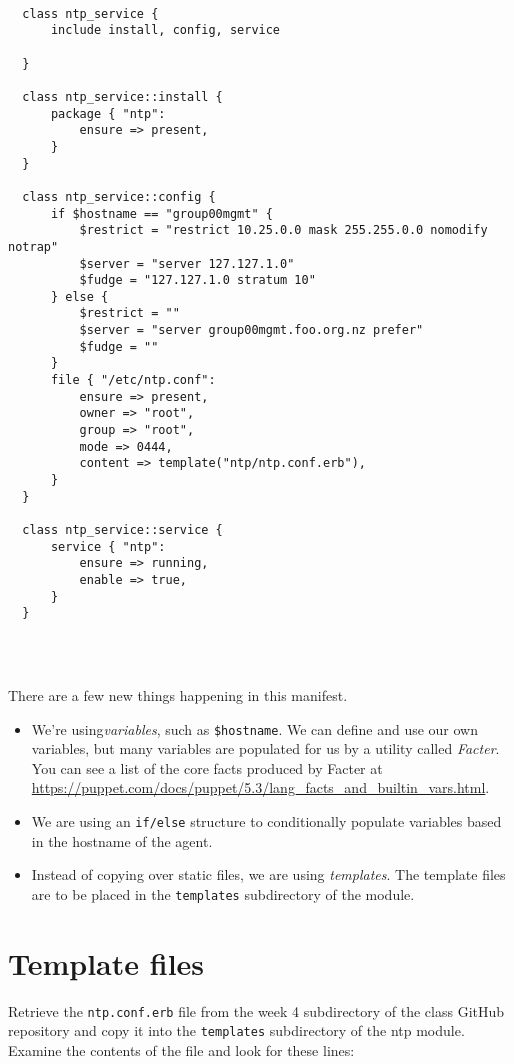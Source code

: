 \documentclass{article}   	%
\begin{document}
\begin{verbatim}

  class ntp_service {
      include install, config, service

  }

  class ntp_service::install {
      package { "ntp":
          ensure => present,
      }
  }

  class ntp_service::config {
      if $hostname == "group00mgmt" {
          $restrict = "restrict 10.25.0.0 mask 255.255.0.0 nomodify notrap"
          $server = "server 127.127.1.0"
          $fudge = "127.127.1.0 stratum 10"
      } else {
          $restrict = ""
          $server = "server group00mgmt.foo.org.nz prefer"
          $fudge = ""
      }
      file { "/etc/ntp.conf":
          ensure => present,
          owner => "root",
          group => "root",
          mode => 0444,
          content => template("ntp/ntp.conf.erb"),
      }    
  }

  class ntp_service::service {
      service { "ntp":
          ensure => running,
          enable => true,
      }    
  }


  
\end{verbatim}



There are a few new things happening in this manifest.
\begin{itemize}
  \item We're using\emph{variables}, such as \texttt{\$hostname}.  We can define and use our own variables, but many variables are populated for us by a utility called \emph{Facter}.  You can see a list of the core facts produced by Facter at \url{https://puppet.com/docs/puppet/5.3/lang_facts_and_builtin_vars.html}.
  \item We are using an \texttt{if/else} structure to conditionally populate variables based in the hostname of the agent.
  \item Instead of copying over static files, we are using \emph{templates}.  The template files are to be placed in the \texttt{templates} subdirectory of the module.
\end{itemize}

\section{Template files}
Retrieve the \texttt{ntp.conf.erb} file from the week 4 subdirectory of the class GitHub repository and copy it into the \texttt{templates} subdirectory of the ntp module. Examine the contents of the file and look for these lines:
\end{document}
